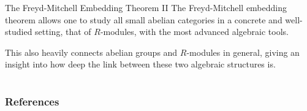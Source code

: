 \documentclass{beamer}
\begin{document}
\begin{frame}{The Freyd-Mitchell Embedding Theorem II}
    The Freyd-Mitchell embedding theorem allows one to study all small
    abelian categories in a concrete and well-studied setting, that
    of $R$-modules, with the most advanced algebraic tools. \medskip

    This also heavily connects abelian groups and $R$-modules in general,
    giving an insight into how deep the link between these two
    algebraic structures is.
\end{frame}


\section*{}

\nocite{*}

\begin{frame}
        \frametitle{References}
        \printbibliography
\end{frame}
\end{document}
